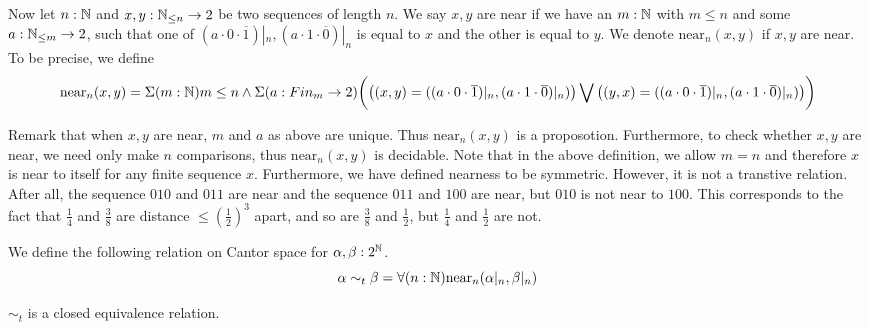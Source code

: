 \begin{definition}
Now let $n:\mathbb{N}$ and $x,y:\mathbb{N}_{\leq n} \to 2$ be two sequences of length $n$. 
We say $x,y$ are near if we have an $m:\mathbb{N}$ with $m\leq n$
and some $a: \mathbb{N}_{\leq m} \to 2$, 
such that one of $(a \cdot 0 \cdot \overline 1)|_n,  ( a \cdot 1 \cdot \overline 0)|_n$
is equal to $x$ and the other is equal to $y$. 
We denote $\text{near}_n(x,y)$ if $x,y$ are near. 
%
To be precise, we define 
\begin{equation}
  \text{near}_n(x,y) = 
\Sigma(m:\mathbb{N}) m \leq n \wedge 
  \Sigma (a : Fin_m \to 2) 
\bigg( \big( (x,y) = 
((a \cdot 0 \cdot \overline 1)|_n,  ( a \cdot 1 \cdot \overline 0)|_n)
\big)
\bigvee 
\big(
  (y,x) = 
((a \cdot 0 \cdot \overline 1)|_n,  ( a \cdot 1 \cdot \overline 0)|_n)
\big)
\bigg)
\end{equation}
\end{definition}
\begin{remark}
Remark that when $x,y$ are near, $m$ and $a$ as above are unique. 
Thus $\text{near}_n(x,y)$ is a proposotion. 
%
Furthermore, to check whether $x,y$ are near, we need only make $n$ comparisons, 
thus $\text{near}_n(x,y)$ is decidable. 
%
Note that in the above definition, we allow $m = n$ and therefore $x$ is near to itself for any finite sequence $x$. 
Furthermore, we have defined nearness to be symmetric. 
However, it is not a transtive relation. 
After all, the sequence $010$ and $011$ are near and the sequence $011$ and $100$ are near, 
but $010$ is not near to $100$. This corresponds to the fact that $\frac14$ and $\frac38$ are distance $\leq (\frac12)^3$
apart, and so are $\frac38$ and $\frac12$, but $\frac14$ and $\frac12$ are not. 
\end{remark}
\begin{definition}
  We define the following relation on Cantor space for $\alpha, \beta: 2^{\mathbb{N}}$.
  \begin{equation}
    \alpha \sim_t \beta = \forall (n : \mathbb{N}) 
    \text{near}_n(\alpha|_n, \beta|_n)
  \end{equation}
\end{definition}
\begin{lemma}
  $\sim_t$ is a closed equivalence relation. 
\end{lemma}
